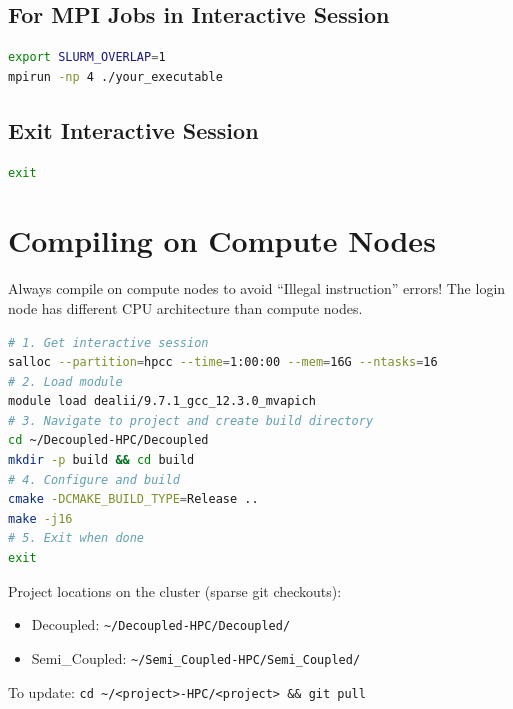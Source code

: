 \documentclass[11pt,a4paper]{article}
\begin{document}
\subsection{For MPI Jobs in Interactive Session}
\begin{lstlisting}[language=bash]
export SLURM_OVERLAP=1
mpirun -np 4 ./your_executable
\end{lstlisting}
\subsection{Exit Interactive Session}
\begin{lstlisting}[language=bash]
exit
\end{lstlisting}
\section{Compiling on Compute Nodes}
\begin{warningbox}
Always compile on compute nodes to avoid ``Illegal instruction'' errors!
The login node has different CPU architecture than compute nodes.
\end{warningbox}
\begin{lstlisting}[language=bash]
# 1. Get interactive session
salloc --partition=hpcc --time=1:00:00 --mem=16G --ntasks=16
# 2. Load module
module load dealii/9.7.1_gcc_12.3.0_mvapich
# 3. Navigate to project and create build directory
cd ~/Decoupled-HPC/Decoupled
mkdir -p build && cd build
# 4. Configure and build
cmake -DCMAKE_BUILD_TYPE=Release ..
make -j16
# 5. Exit when done
exit
\end{lstlisting}
\begin{notebox}
Project locations on the cluster (sparse git checkouts):
\begin{itemize}[nosep]
    \item Decoupled: \texttt{\textasciitilde/Decoupled-HPC/Decoupled/}
    \item Semi\_Coupled: \texttt{\textasciitilde/Semi\_Coupled-HPC/Semi\_Coupled/}
\end{itemize}
To update: \texttt{cd \textasciitilde/<project>-HPC/<project> \&\& git pull}
\end{notebox}
\end{document}
